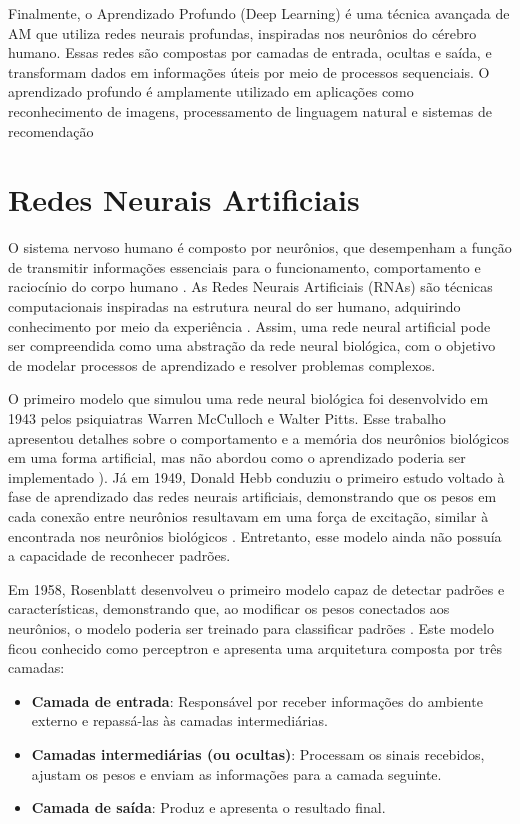 Finalmente, o Aprendizado Profundo (Deep Learning) é uma técnica avançada de AM que utiliza redes neurais profundas, inspiradas nos neurônios do cérebro humano. Essas redes são compostas por camadas de entrada, ocultas e saída, e transformam dados em informações úteis por meio de processos sequenciais. O aprendizado profundo é amplamente utilizado em aplicações como reconhecimento de imagens, processamento de linguagem natural e sistemas de recomendação \cite{arroyo2000}


\section {Redes Neurais Artificiais}

O sistema nervoso humano é composto por neurônios, que desempenham a função de transmitir informações essenciais para o funcionamento, comportamento e raciocínio do corpo humano \cite{tafner1995}. As Redes Neurais Artificiais (RNAs) são técnicas computacionais inspiradas na estrutura neural do ser humano, adquirindo conhecimento por meio da experiência \cite{haykin1999}. Assim, uma rede neural artificial pode ser compreendida como uma abstração da rede neural biológica, com o objetivo de modelar processos de aprendizado e resolver problemas complexos.

O primeiro modelo que simulou uma rede neural biológica foi desenvolvido em 1943 pelos psiquiatras Warren McCulloch e Walter Pitts. Esse trabalho apresentou detalhes sobre o comportamento e a memória dos neurônios biológicos em uma forma artificial, mas não abordou como o aprendizado poderia ser implementado \cite{mcculloch1943}). Já em 1949, Donald Hebb conduziu o primeiro estudo voltado à fase de aprendizado das redes neurais artificiais, demonstrando que os pesos em cada conexão entre neurônios resultavam em uma força de excitação, similar à encontrada nos neurônios biológicos \cite{hebb1949}. Entretanto, esse modelo ainda não possuía a capacidade de reconhecer padrões.

Em 1958, Rosenblatt desenvolveu o primeiro modelo capaz de detectar padrões e características, demonstrando que, ao modificar os pesos conectados aos neurônios, o modelo poderia ser treinado para classificar padrões \cite{rosenblatt1958}. Este modelo ficou conhecido como perceptron e apresenta uma arquitetura composta por três camadas:

\begin{itemize}  
    \item \textbf{Camada de entrada}: Responsável por receber informações do ambiente externo e repassá-las às camadas intermediárias.
    \item \textbf{Camadas intermediárias (ou ocultas)}: Processam os sinais recebidos, ajustam os pesos e enviam as informações para a camada seguinte.
    \item \textbf{Camada de saída}: Produz e apresenta o resultado final.
\end{itemize}

